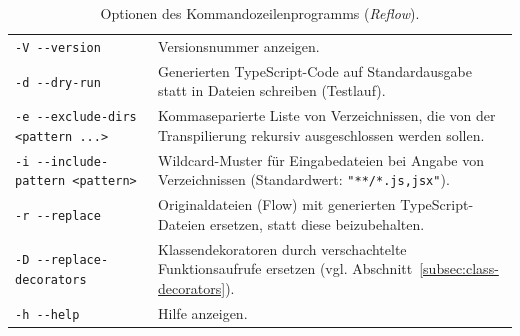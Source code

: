 \bigbreak
\begin{table}[tbh]
  \begin{tabu} to 
    \midrule
     &  \\
    \midrule
    \smallskip
    \texttt{-V -{}-version} & Versionsnummer anzeigen. \\
    \smallskip
    \texttt{-d -{}-dry-run} & Generierten TypeScript-Code auf Standardausgabe statt in Dateien schreiben (Testlauf).\\
    \smallskip
    \texttt{-e -{}-exclude-dirs <pattern ...>} & Kommaseparierte Liste von Verzeichnissen, die von der Transpilierung rekursiv ausgeschlossen werden sollen. \\
    \smallskip
    \texttt{-i -{}-include-pattern <pattern>} & Wildcard-Muster für Eingabedateien bei Angabe von Verzeichnissen (Standardwert: \texttt{"**/*.{js,jsx}"}). \\
    \smallskip
    \texttt{-r -{}-replace} & Originaldateien (Flow) mit generierten TypeScript-Dateien ersetzen, statt diese beizubehalten. \\
    \smallskip
    \texttt{-D -{}-replace-decorators} & Klassendekoratoren durch verschachtelte Funktionsaufrufe ersetzen (vgl. Abschnitt~\ref{subsec:class-decorators}). \\
    \smallskip
    \texttt{-h -{}-help} & Hilfe anzeigen. \\
    \midrule
  \end{tabu}
  \caption{Optionen des Kommandozeilenprogramms (\textit{Reflow}).}
  \label{tab:cli-options}
\end{table}

